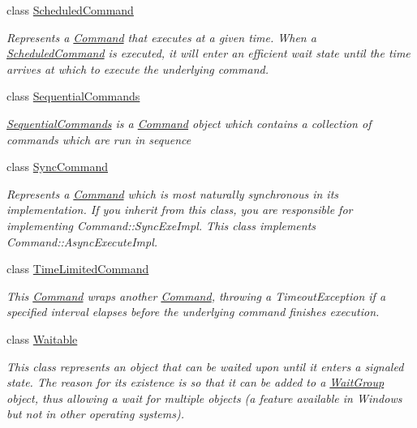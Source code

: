 \begin{DoxyCompactItemize}
class \mbox{\hyperlink{class_command_lib_1_1_scheduled_command}{Scheduled\+Command}}
\begin{DoxyCompactList}\small\item\em Represents a \mbox{\hyperlink{class_command_lib_1_1_command}{Command}} that executes at a given time. When a \mbox{\hyperlink{class_command_lib_1_1_scheduled_command}{Scheduled\+Command}} is executed, it will enter an efficient wait state until the time arrives at which to execute the underlying command. \end{DoxyCompactList}\item 
class \mbox{\hyperlink{class_command_lib_1_1_sequential_commands}{Sequential\+Commands}}
\begin{DoxyCompactList}\small\item\em \mbox{\hyperlink{class_command_lib_1_1_sequential_commands}{Sequential\+Commands}} is a \mbox{\hyperlink{class_command_lib_1_1_command}{Command}} object which contains a collection of commands which are run in sequence \end{DoxyCompactList}\item 
class \mbox{\hyperlink{class_command_lib_1_1_sync_command}{Sync\+Command}}
\begin{DoxyCompactList}\small\item\em Represents a \mbox{\hyperlink{class_command_lib_1_1_command}{Command}} which is most naturally synchronous in its implementation. If you inherit from this class, you are responsible for implementing Command\+::\+Sync\+Exe\+Impl. This class implements Command\+::\+Async\+Execute\+Impl. \end{DoxyCompactList}\item 
class \mbox{\hyperlink{class_command_lib_1_1_time_limited_command}{Time\+Limited\+Command}}
\begin{DoxyCompactList}\small\item\em This \mbox{\hyperlink{class_command_lib_1_1_command}{Command}} wraps another \mbox{\hyperlink{class_command_lib_1_1_command}{Command}}, throwing a Timeout\+Exception if a specified interval elapses before the underlying command finishes execution. \end{DoxyCompactList}\item 
class \mbox{\hyperlink{class_command_lib_1_1_waitable}{Waitable}}
\begin{DoxyCompactList}\small\item\em This class represents an object that can be waited upon until it enters a signaled state. The reason for its existence is so that it can be added to a \mbox{\hyperlink{class_command_lib_1_1_wait_group}{Wait\+Group}} object, thus allowing a wait for multiple objects (a feature available in Windows but not in other operating systems). \end{DoxyCompactList}\item 

\end{DoxyCompactItemize}
